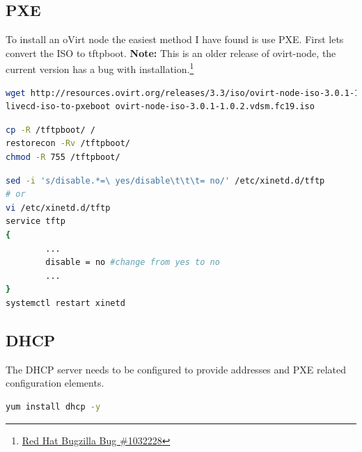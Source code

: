\documentclass[11pt,letterpaper,oneside]{book}
\begin{document}
\subsection{PXE}
To install an oVirt node the easiest method I have found is use PXE.  First lets convert the ISO to tftpboot. \textbf{Note:} This is an older release of ovirt-node, the current version has a bug with installation.\footnote{\href{https://bugzilla.redhat.com/show_bug.cgi?id=1032228}{Red Hat Bugzilla Bug \#1032228}}

\begin{lstlisting}[caption={Download and convert oVirt Node},language=bash]
wget http://resources.ovirt.org/releases/3.3/iso/ovirt-node-iso-3.0.1-1.0.2.vdsm.fc19.iso
livecd-iso-to-pxeboot ovirt-node-iso-3.0.1-1.0.2.vdsm.fc19.iso
\end{lstlisting}

\begin{lstlisting}[caption={Copy tftproot to root, restore SELinux context, change permissions},language=bash]
cp -R /tftpboot/ /
restorecon -Rv /tftpboot/
chmod -R 755 /tftpboot/
\end{lstlisting}

\begin{lstlisting}[caption={Enable TFTP},language=bash]
sed -i 's/disable.*=\ yes/disable\t\t\t= no/' /etc/xinetd.d/tftp
# or
vi /etc/xinetd.d/tftp
service tftp
{
        ...
        disable = no #change from yes to no
        ...
}
systemctl restart xinetd
\end{lstlisting}

\subsection{DHCP}
The DHCP server needs to be configured to provide addresses and PXE related configuration elements.
\begin{lstlisting}[caption={Install ISC DHCP server},language=bash]
yum install dhcp -y 
\end{lstlisting}
\end{document}
